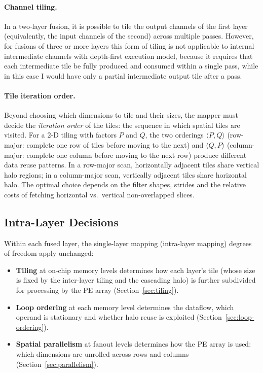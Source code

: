 \paragraph{Channel tiling.}
In a two-layer fusion, it is possible to tile the output channels of the
first layer (equivalently, the input channels of the second) across
multiple passes.
However, for fusions of three or more layers this form of tiling is
not applicable to internal intermediate channels with depth-first
execution model, because it requires that each intermediate tile be fully
produced and consumed within a single pass, while in this case I would have 
only a partial intermediate output tile after a pass. 


\paragraph{Tile iteration order.}
Beyond choosing which dimensions to tile and their sizes, the mapper
must decide the \emph{iteration order} of the tiles: the sequence in
which spatial tiles are visited.
For a 2-D tiling with factors $P$ and $Q$, the two orderings
$\langle P, Q \rangle$ (row-major: complete one row of tiles before
moving to the next) and $\langle Q, P \rangle$ (column-major: complete
one column before moving to the next row) produce different data
reuse patterns.
In a row-major scan, horizontally adjacent tiles share vertical
halo regions; in a column-major scan, vertically adjacent tiles
share horizontal halo.
The optimal choice depends on the filter shapes, strides and the relative
costs of fetching horizontal vs.\ vertical non-overlapped slices.


\subsection{Intra-Layer Decisions}
\label{sec:fds-intra}

Within each fused layer, the single-layer mapping (intra-layer mapping) degrees of freedom
apply unchanged:
\begin{itemize}
  \item \textbf{Tiling} at on-chip memory levels determines how each
        layer's tile (whose size is fixed by the inter-layer tiling and
        the cascading halo) is further subdivided for processing by the
        PE array (Section~\ref{sec:tiling}).
  \item \textbf{Loop ordering} at each memory level determines the
        dataflow, which operand is stationary and whether halo reuse
        is exploited (Section~\ref{sec:loop-ordering}).
  \item \textbf{Spatial parallelism} at fanout levels determines how
        the PE array is used: which dimensions are unrolled across
        rows and columns (Section~\ref{sec:parallelism}).
\end{itemize}

